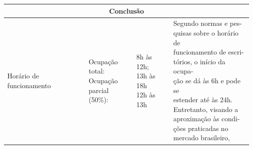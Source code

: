 \begin{table}[H]
        \centering
        \small
        \begin{tabular*}{\columnwidth}{@{\extracolsep{\fill}}llll}
        \hline
        \multicolumn{4}{c}{Conclusão}\\\hline
        \multirow{2}{*}{Horário de funcionamento}                          & \makecell[l]{Ocupação\\ total:\vspace*{0,2cm}\\Ocupação \\parcial (50\%):\vspace*{0,6cm}}  & \makecell[l]{8h às 12h; \\13h às 18h \vspace*{0,6cm}\\12h às 13h} & \makecell[l]{Segundo normas e pes-\\quisas
                                                                                                                                                                                                                                                sobre o horário de\\ funcionamento de 
                                                                                                                                                                                                                                                escri-\\tórios, o início da ocupa-\\ção se 
                                                                                                                                                                                                                                                dá às 6h e pode se\\ estender até às 24h.\\ 
                                                                                                                                                                                                                                                Entretanto, visando a\\ aproximação às 
                                                                                                                                                                                                                                                condi-\\ções praticadas no\\ mercado brasileiro,\\ 
}
\end{tabular*}
\end{table}
